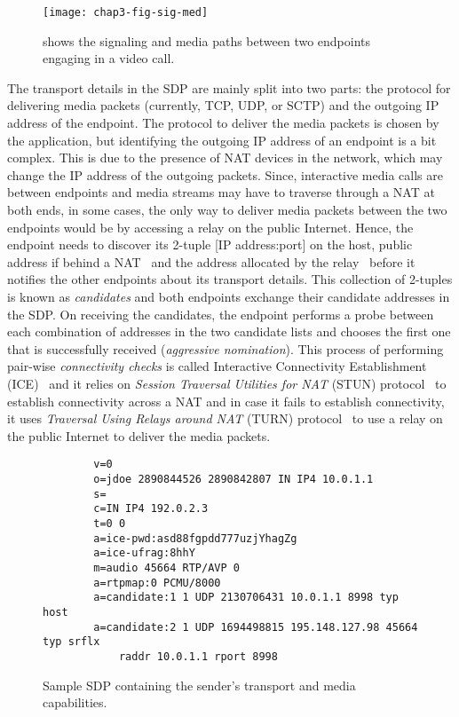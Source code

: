 \begin{figure}[!h]
\centerline{\texttt{[image: chap3-fig-sig-med]}}
\caption{shows the signaling and media paths between two endpoints engaging in
a video call.}
\label{fig:3:sig.media}
\end{figure}


The transport details in the SDP are mainly split into two parts: the protocol
for delivering media packets (currently, TCP, UDP, or SCTP) and the outgoing
IP address of the endpoint. The protocol to deliver the media packets is
chosen by the application, but identifying the outgoing IP address of an
endpoint is a bit complex. This is due to the presence of NAT devices in the
network, which may change the IP address of the outgoing packets. Since,
interactive media calls are between endpoints and media streams may have to
traverse through a NAT at both ends, in some cases, the only way to deliver
media packets between the two endpoints would be by accessing a relay on the
public Internet. Hence, the endpoint needs to discover its 2-tuple [IP
address:port] on the host, public address if behind a NAT~\cite{rfc5389} and
the address allocated by the relay~\cite{rfc5766} before it notifies the other
endpoints about its transport details. This collection of 2-tuples is known as
\emph{candidates} and both endpoints exchange their candidate addresses in the
SDP. On receiving the candidates, the endpoint performs a probe between each
combination of addresses in the two candidate lists and chooses the first one
that is successfully received (\emph{aggressive nomination}). This process of
performing pair-wise \emph{connectivity checks} is called Interactive
Connectivity Establishment (ICE)~\cite{rfc5245, rfc6544} and it relies on
\emph{Session Traversal Utilities for NAT} (STUN) protocol~\cite{rfc5389} to
establish connectivity across a NAT and in case it fails to establish
connectivity, it uses \emph{Traversal Using Relays around NAT} (TURN)
protocol~\cite{rfc5766} to use a relay on the public Internet to deliver the
media packets.


\begin{figure}[!h]
{\small
\begin{verbatim}
        v=0
        o=jdoe 2890844526 2890842807 IN IP4 10.0.1.1
        s=
        c=IN IP4 192.0.2.3
        t=0 0
        a=ice-pwd:asd88fgpdd777uzjYhagZg
        a=ice-ufrag:8hhY
        m=audio 45664 RTP/AVP 0
        a=rtpmap:0 PCMU/8000
        a=candidate:1 1 UDP 2130706431 10.0.1.1 8998 typ host
        a=candidate:2 1 UDP 1694498815 195.148.127.98 45664 typ srflx 
            raddr 10.0.1.1 rport 8998
\end{verbatim}
}
\caption{Sample SDP containing the sender's transport and media capabilities.}
\label{fig:3:sdp}
\end{figure}

